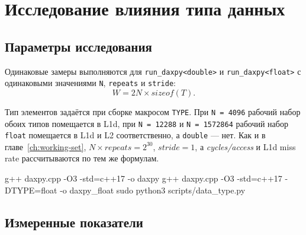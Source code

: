 \chapter{Исследование влияния типа данных}
\label{ch:data-type}

\section{Параметры исследования}

Одинаковые замеры выполняются для \texttt{run\_daxpy<double>} и \texttt{run\_daxpy<float>} с одинаковыми значениями \texttt{N}, \texttt{repeats} и \texttt{stride}:
$$
W = 2N \times \mathit{sizeof}(T).
$$

Тип элементов задаётся при сборке макросом \texttt{TYPE}.
При \texttt{N = 4096} рабочий набор обоих типов помещается в L1d, при \texttt{N = 12288} и \texttt{N = 1572864} рабочий набор \texttt{float} помещается в L1d и L2 соответственно, а \texttt{double} --- нет.
Как и в главе~\ref{ch:working-set}, $N \times \mathit{repeats} = 2^{30}$, $\mathit{stride} = 1$, а \textit{cycles/access} и L1d miss rate рассчитываются по тем же формулам.

\begin{commands}
g++ daxpy.cpp -O3 -std=c++17 -o daxpy
g++ daxpy.cpp -O3 -std=c++17 -DTYPE=float -o daxpy_float
sudo python3 scripts/data_type.py
\end{commands}


\section{Измеренные показатели}

